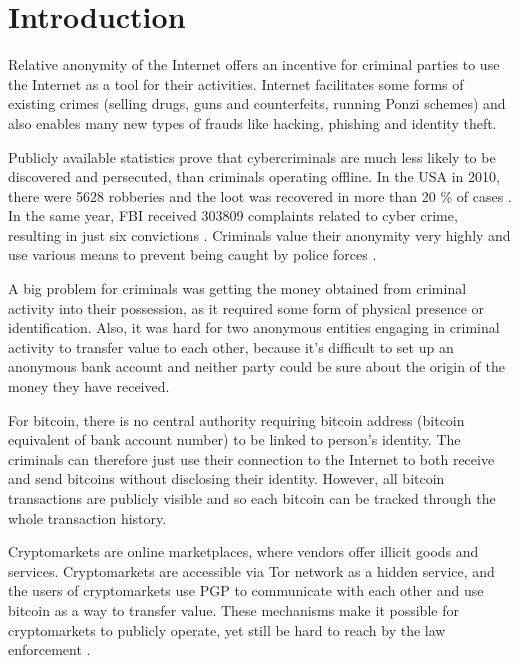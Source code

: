 \documentclass[
  digital, %
  table,   %
  lof,     %
  lot,     %
  oneside
]{fithesis3}
\begin{document}
\chapter{Introduction}

Relative anonymity of the Internet offers an incentive for criminal parties
to use the Internet as a tool for their activities.
Internet facilitates some forms of existing crimes (selling drugs, guns and
counterfeits, running Ponzi schemes) and also enables many new types of frauds like hacking, phishing and identity theft.

Publicly available statistics prove that cybercriminals are much
 less likely to be discovered and persecuted, than criminals operating offline.
 In the USA in 2010, there were 5628 robberies and the loot was recovered in more than 20 \% of cases \cite{fbi10}.
 In the same year, FBI received 303809 complaints related to cyber crime, resulting in just six convictions \cite{fbcyber}. 
Criminals value their anonymity very highly and use various means to prevent being caught by police forces \cite{tzanetakis2016transparency}\cite{van2013surfing}\cite{aldridge2014not}.

A big problem for criminals was getting the money obtained from criminal activity into their possession,
as it required some form of physical presence or identification.
Also, it was hard for two anonymous entities engaging in criminal activity to transfer value to each other,
 because it's difficult to set up an anonymous bank account and neither party could be sure about the origin of
 the money they have received.

For bitcoin, there is no central authority requiring bitcoin address
(bitcoin equivalent of bank account number) to be linked to person's identity. The criminals can therefore 
just use their connection to the Internet to both receive and send bitcoins without disclosing their identity.
However, all bitcoin transactions are publicly visible and so each bitcoin can be tracked through the whole transaction history.

 Cryptomarkets are online marketplaces, where vendors offer illicit goods and services.
 Cryptomarkets are accessible via Tor network as a hidden service, and the users of
 cryptomarkets use PGP to communicate with each other and use bitcoin as a way to transfer value.
These mechanisms make it possible for cryptomarkets
to publicly operate, yet still be hard to reach by the law enforcement \cite{cox2016staying}.
\end{document}
